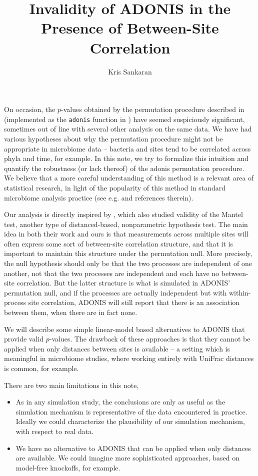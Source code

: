 \documentclass{article}
\title{Invalidity of ADONIS in the Presence of Between-Site Correlation}
\author{Kris Sankaran}
\begin{document}
\maketitle

On occasion, the $p$-values obtained by the permutation procedure described in
\citep{anderson2001new} (implemented as the \texttt{adonis} function in
\cite{oksanen2007vegan}) have seemed suspiciously significant, sometimes out of
line with several other analysis on the same data. We have had various
hypotheses about why the permutation procedure might not be appropriate in
microbiome data -- bacteria and sites tend to be correlated across phyla and
time, for example. In this note, we try to formalize this intuition and quantify
the robustness (or lack thereof) of the adonis permutation procedure. We believe
that a more careful understanding of this method is a relevant area of
statistical research, in light of the popularity of this method in standard
microbiome analysis practice (see e.g. \cite{fukuyama2012comparisons} and
references therein).

Our analysis is directly inspired by \citep{guillot2013dismantling}, which also
studied validity of the Mantel test, another type of distanced-based,
nonparametric hypothesis test. The main idea in both their work and ours is that
measurements across multiple sites will often express some sort of between-site
correlation structure, and that it is important to maintain this structure under
the permutation null. More precisely, the null hypothesis should only be that
the two processes are independent of one another, not that the two processes are
independent and each have no between-site correlation. But the latter structure
is what is simulated in ADONIS' permutation null, and if the processes are
actually independent but with within-process site correlation, ADONIS will still
report that there is an association between them, when there are in fact none.

We will describe some simple linear-model based alternatives to ADONIS that
provide valid $p$-values. The drawback of these approaches is that they cannot
be applied when only distances between sites is available -- a setting which is
meaningful in microbiome studies, where working entirely with UniFrac distances
\citep{lozupone2005unifrac} is common, for example.

There are two main limitations in this note,

\begin{itemize}
\item As in any simulation study, the conclusions are only as useful as the
  simulation mechanism is representative of the data encountered in practice.
  Ideally we could characterize the plausibility of our simulation mechanism,
  with respect to real data.
\item We have no alternative to ADONIS that can be applied when only distances
  are available. We could imagine more sophisticated approaches, based on
  model-free knockoffs, for example.
\end{itemize}
\end{document}
